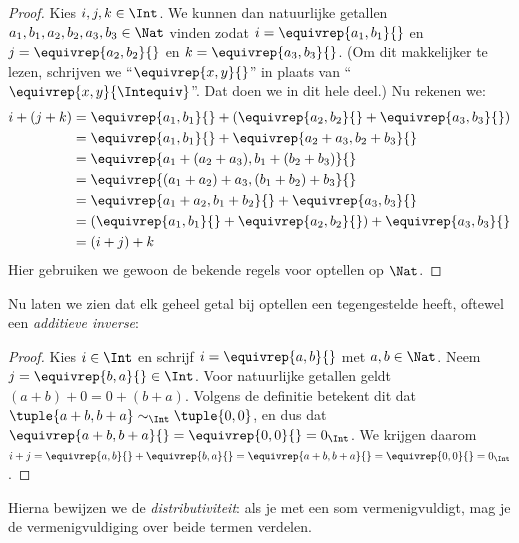 \documentclass[openany]{memoir}
\begin{document}
\begin{proof} 
Kies $i, j, k \in \Int$. We kunnen dan natuurlijke getallen $a_1, b_1,
a_2, b_2, a_3, b_3 \in \Nat$ vinden zodat $i = \equivrep{a_1, b_1}{}$ en $j =
\equivrep{a_2,b_2}{}$ en $k = \equivrep{a_3, b_3}{}$. (Om dit
makkelijker te lezen, schrijven we ``$\equivrep{x, y}{}$'' in plaats van
``$\equivrep{x, y}{\Intequiv}$''. Dat doen we in dit hele
deel.) Nu rekenen we:
\begin{align*}
	i + (j + k) &= \equivrep{a_1, b_1}{}+(\equivrep{a_2, b_2}{} + \equivrep{a_3, b_3}{}) \\
	&= \equivrep{a_1,  b_1}{} + \equivrep{a_2+a_3, b_2+b_3}{}\\
	&= \equivrep{a_1 + (a_2 + a_3), b_1 + (b_2 + b_3)}{}\\
	&= \equivrep{(a_1 + a_2) + a_3, (b_1 + b_2) + b_3}{}\\
	&= \equivrep{a_1 + a_2, b_1 + b_2}{} + \equivrep{a_3, b_3}{}\\
	&= (\equivrep{a_1, b_1}{} + \equivrep{a_2, b_2}{}) + \equivrep{a_3, b_3}{}\\
	&= (i+j) + k
\end{align*}
Hier gebruiken we gewoon de bekende regels voor optellen op $\Nat$.
\end{proof}
Nu laten we zien dat elk geheel getal bij optellen een tegengestelde
heeft, oftewel een \emph{additieve inverse}:
\begin{proof}
Kies $i \in \Int$ en schrijf $i = \equivrep{a,b}{}$ met $a,b \in
\Nat$. Neem $j = \equivrep{b,a}{} \in
\Int$. Voor natuurlijke getallen geldt $(a+b) + 0 = 0 + (b+a)$.
Volgens de definitie betekent dit dat $\tuple{a+b, b+a} \sim_\Int
\tuple{0,0}$, en dus dat $\equivrep{a+b, b+a}{} = \equivrep{0, 0}{}
= 0_\Int$. We krijgen daarom $i + j =
\equivrep{a,b}{}+\equivrep{b,a}{}=\equivrep{a+b, b+a}{}= \equivrep{0,
0}{} = 0_\Int$.
\end{proof}
Hierna bewijzen we de \emph{distributiviteit}: als je met een som
vermenigvuldigt, mag je de vermenigvuldiging over beide termen
verdelen.
\end{document}
